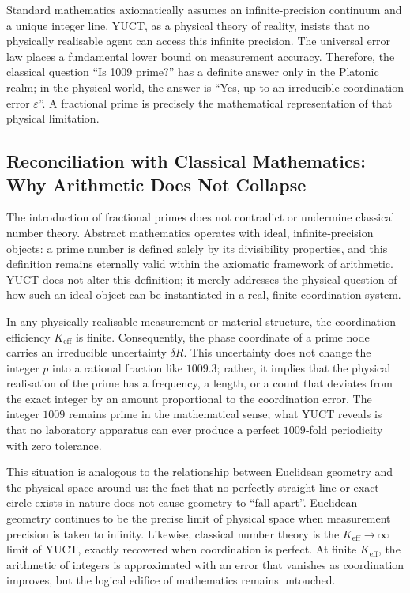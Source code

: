 \documentclass[12pt,a4paper]{article}
\theoremstyle{remark}
\begin{document}
Standard mathematics axiomatically assumes an infinite-precision continuum and a unique integer line. YUCT, as a physical theory of reality, insists that no physically realisable agent can access this infinite precision. The universal error law places a fundamental lower bound on measurement accuracy. Therefore, the classical question “Is 1009 prime?” has a definite answer only in the Platonic realm; in the physical world, the answer is “Yes, up to an irreducible coordination error \(\varepsilon\)”. A fractional prime is precisely the mathematical representation of that physical limitation.

\subsection{Reconciliation with Classical Mathematics: Why Arithmetic Does Not Collapse}

The introduction of fractional primes does not contradict or undermine classical number theory. Abstract mathematics operates with ideal, infinite‑precision objects: a prime number is defined solely by its divisibility properties, and this definition remains eternally valid within the axiomatic framework of arithmetic. YUCT does not alter this definition; it merely addresses the physical question of how such an ideal object can be instantiated in a real, finite‑coordination system.

In any physically realisable measurement or material structure, the coordination efficiency \(K_{\mathrm{eff}}\) is finite. Consequently, the phase coordinate of a prime node carries an irreducible uncertainty \(\delta R\). This uncertainty does not change the integer \(p\) into a rational fraction like \(1009.3\); rather, it implies that the physical realisation of the prime has a frequency, a length, or a count that deviates from the exact integer by an amount proportional to the coordination error. The integer \(1009\) remains prime in the mathematical sense; what YUCT reveals is that no laboratory apparatus can ever produce a perfect \(1009\)‑fold periodicity with zero tolerance.

This situation is analogous to the relationship between Euclidean geometry and the physical space around us: the fact that no perfectly straight line or exact circle exists in nature does not cause geometry to ``fall apart''. Euclidean geometry continues to be the precise limit of physical space when measurement precision is taken to infinity. Likewise, classical number theory is the \(K_{\mathrm{eff}} \to \infty\) limit of YUCT, exactly recovered when coordination is perfect. At finite \(K_{\mathrm{eff}}\), the arithmetic of integers is approximated with an error that vanishes as coordination improves, but the logical edifice of mathematics remains untouched.
\end{document}
